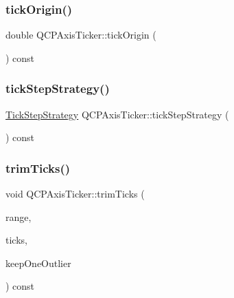 \mbox{\label{class_q_c_p_axis_ticker_ac0c6e9587c36fdeefb5518c00fe7ab15}} 
\subsubsection{\texorpdfstring{tick\+Origin()}{tickOrigin()}}
{\footnotesize\ttfamily double Q\+C\+P\+Axis\+Ticker\+::tick\+Origin (\begin{DoxyParamCaption}{ }\end{DoxyParamCaption}) const\hspace{0.3cm}{\ttfamily [inline]}}

\mbox{\label{class_q_c_p_axis_ticker_a58df76f2ec3eb48401bdd314b0e14ba1}} 
\subsubsection{\texorpdfstring{tick\+Step\+Strategy()}{tickStepStrategy()}}
{\footnotesize\ttfamily \hyperlink{class_q_c_p_axis_ticker_ab6d2f9d9477821623ac9bc4b21ddf49a}{Tick\+Step\+Strategy} Q\+C\+P\+Axis\+Ticker\+::tick\+Step\+Strategy (\begin{DoxyParamCaption}{ }\end{DoxyParamCaption}) const\hspace{0.3cm}{\ttfamily [inline]}}

\mbox{\label{class_q_c_p_axis_ticker_ab28cc1ab549489be7975f5ce7e717916}} 
\subsubsection{\texorpdfstring{trim\+Ticks()}{trimTicks()}}
{\footnotesize\ttfamily void Q\+C\+P\+Axis\+Ticker\+::trim\+Ticks (\begin{DoxyParamCaption}\item[{const \hyperlink{class_q_c_p_range}{Q\+C\+P\+Range} \&}]{range,  }\item[{Q\+Vector$<$ double $>$ \&}]{ticks,  }\item[{bool}]{keep\+One\+Outlier }\end{DoxyParamCaption}) const\hspace{0.3cm}{\ttfamily [protected]}}



